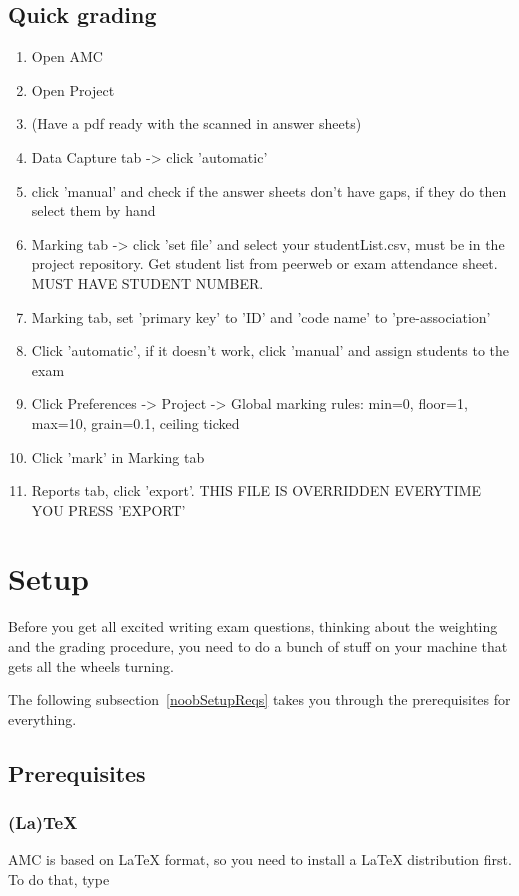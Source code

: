 \documentclass{article}
\begin{document}
\subsection{\label{proGrading}Quick grading}

\begin{enumerate}
	\item Open AMC
	\item Open Project
	\item (Have a pdf ready with the scanned in answer sheets)
	\item Data Capture tab -> click 'automatic'
	\item click 'manual' and check if the answer sheets don't have gaps, if they do then select them by hand
	\item Marking tab -> click 'set file' and select your studentList.csv, must be in the project repository. Get student list from peerweb or exam attendance sheet. MUST HAVE STUDENT NUMBER.
	\item Marking tab, set 'primary key' to 'ID' and 'code name' to 'pre-association'
	\item Click 'automatic', if it doesn't work, click 'manual' and assign students to the exam
	\item Click Preferences -> Project -> Global marking rules: min=0, floor=1, max=10, grain=0.1, ceiling ticked
	\item Click 'mark' in Marking tab
	\item Reports tab, click 'export'. THIS FILE IS OVERRIDDEN EVERYTIME YOU PRESS 'EXPORT'
\end{enumerate}

\section{\label{noobSetup}Setup}
Before you get all excited writing exam questions, thinking about the weighting and the grading procedure, you need to do a bunch of stuff on your machine that gets all the wheels turning. 

The following subsection~\ref{noobSetupReqs} takes you through the prerequisites for everything. 
\subsection{\label{noobSetupReqs}Prerequisites}
\subsubsection{(La)TeX}
AMC is based on LaTeX format, so you need to install a LaTeX distribution first. To do that, type 
\end{document}
